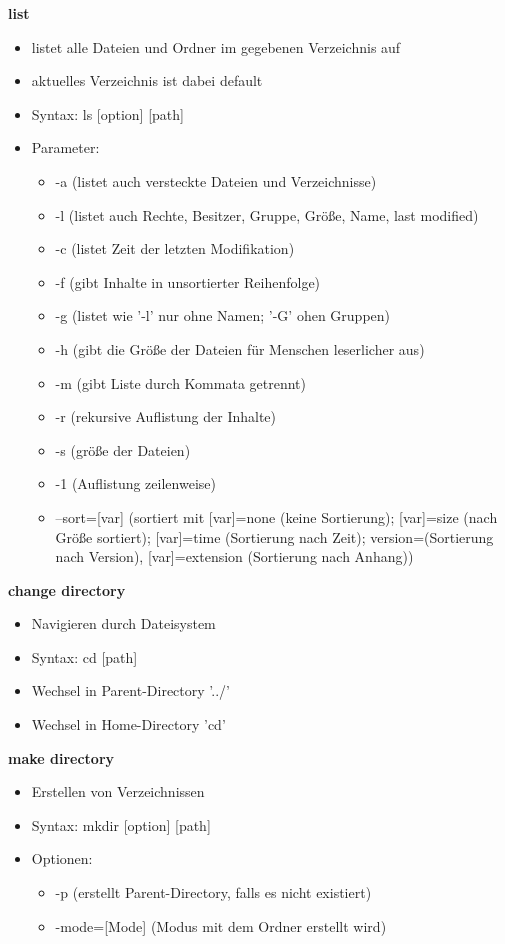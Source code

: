 \documentclass{article}
\begin{document}
\textbf{list}
\begin{itemize}
	\item listet alle Dateien und Ordner im gegebenen Verzeichnis auf
	\item aktuelles Verzeichnis ist dabei default
	\item Syntax: ls [option] [path]
	\item Parameter:
	\begin{itemize}
		\item -a (listet auch versteckte Dateien und Verzeichnisse)
		\item -l (listet auch Rechte, Besitzer, Gruppe, Größe, Name, last modified)
		\item -c (listet Zeit der letzten Modifikation)
		\item -f (gibt Inhalte in unsortierter Reihenfolge)
		\item -g (listet wie '-l' nur ohne Namen; '-G' ohen Gruppen)
		\item -h (gibt die Größe der Dateien für Menschen leserlicher aus)
		\item -m (gibt Liste durch Kommata getrennt)
		\item -r (rekursive Auflistung der Inhalte)
		\item -s (größe der Dateien)
		\item -1 (Auflistung zeilenweise)
		\item --sort=[var] (sortiert mit [var]=none (keine Sortierung); [var]=size (nach Größe sortiert); [var]=time (Sortierung nach Zeit); version=(Sortierung nach Version), [var]=extension (Sortierung nach Anhang))
	\end{itemize}
\end{itemize}

\textbf{change directory}
\begin{itemize}
	\item Navigieren durch Dateisystem
	\item Syntax: cd [path]
	\item Wechsel in Parent-Directory '../'
	\item Wechsel in Home-Directory 'cd' 
\end{itemize}

\textbf{make directory}
\begin{itemize}
	\item Erstellen von Verzeichnissen
	\item Syntax: mkdir [option] [path]
	\item Optionen:
	\begin{itemize}
		\item -p (erstellt Parent-Directory, falls es nicht existiert)
		\item -mode=[Mode] (Modus mit dem Ordner erstellt wird)
	\end{itemize}
\end{itemize}
\end{document}
